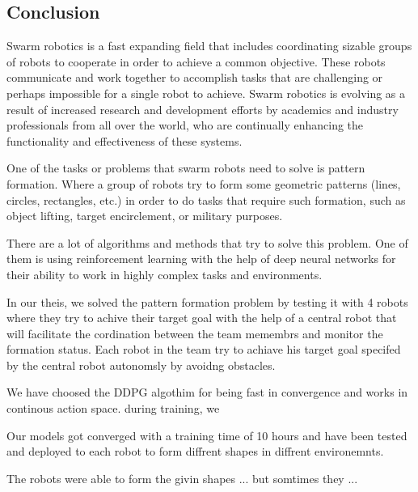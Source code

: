 \documentclass[12pt]{extarticle}
\begin{document}
\afterpage{\clearpage}
 \newpage
\pagebreak
\hspace{0pt}
\vfill
\begin{center}
\section{Conclusion}
\end{center}
\vfill
\hspace{0pt}

\pagebreak


Swarm robotics is a fast expanding  field that includes coordinating sizable groups of robots to cooperate in order to achieve a common objective. These robots communicate and work together to accomplish tasks that are challenging or perhaps impossible for a single robot to achieve.
Swarm robotics is evolving as a result of increased research and development efforts by academics and industry professionals from all over the world, who are continually enhancing the functionality and effectiveness of these systems.




One of the tasks or problems that swarm robots need to solve is pattern formation. Where a group of robots try to form some geometric patterns (lines, circles, rectangles, etc.) in order to do tasks that require such formation, such as object lifting, target encirclement, or military purposes.
 


There are a lot of algorithms and methods that try to solve this problem. One of them is using reinforcement learning with the help of deep neural networks for their ability to work in highly complex tasks and environments.

In our theis, we solved the pattern formation problem by testing it with 4 robots where they try to achive their target goal with the help of a central robot that will facilitate the cordination between the team memembrs and monitor the formation status. Each robot in the team try to achiave his target goal  specifed by the central robot autonomsly by avoidng obstacles. 



We have choosed the DDPG algothim for being fast in convergence and works in continous action space. during training, we  

Our models got converged with a training time of 10  hours and have been tested and deployed to each robot to form diffrent shapes in diffrent environemnts.
 
The robots were able to form the givin shapes ... but somtimes they ...
 
 
 
 





\newpage


\end{document}
